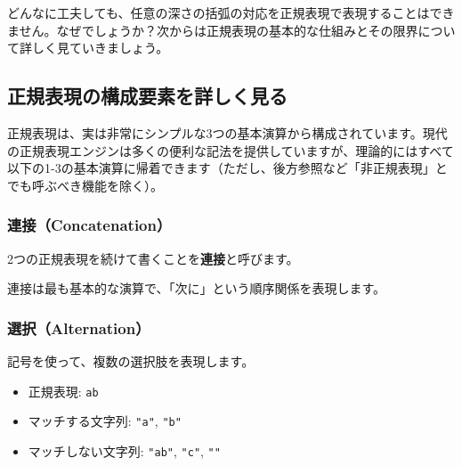 どんなに工夫しても、任意の深さの括弧の対応を正規表現で表現することはできません。なぜでしょうか？次からは正規表現の基本的な仕組みとその限界について詳しく見ていきましょう。

\hypertarget{chapter4-ux6b63ux898fux8868ux73feux306eux69cbux6210ux8981ux7d20ux3092ux8a73ux3057ux304fux898bux308b}{%
\subsection{正規表現の構成要素を詳しく見る}\label{chapter4-ux6b63ux898fux8868ux73feux306eux69cbux6210ux8981ux7d20ux3092ux8a73ux3057ux304fux898bux308b}}

正規表現は、実は非常にシンプルな3つの基本演算から構成されています。現代の正規表現エンジンは多くの便利な記法を提供していますが、理論的にはすべて以下の1-3の基本演算に帰着できます（ただし、後方参照など「非正規表現」とでも呼ぶべき機能を除く）。

\hypertarget{chapter4-ux9023ux63a5concatenation}{%
\subsubsection{連接（Concatenation）}\label{chapter4-ux9023ux63a5concatenation}}

2つの正規表現を続けて書くことを\textbf{連接}と呼びます。

\begin{Shaded}
\begin{Highlighting}[]
\end{Highlighting}
\end{Shaded}

連接は最も基本的な演算で、「次に」という順序関係を表現します。

\hypertarget{chapter4-ux9078ux629ealternation}{%
\subsubsection{選択（Alternation）}\label{chapter4-ux9078ux629ealternation}}

\texttt{\textbar{}}記号を使って、複数の選択肢を表現します。

\begin{itemize}
\tightlist
\item
  正規表現: \texttt{a\textbar{}b}
\item
  マッチする文字列: \texttt{"a"}, \texttt{"b"}
\item
  マッチしない文字列: \texttt{"ab"}, \texttt{"c"}, \texttt{""}
\end{itemize}

